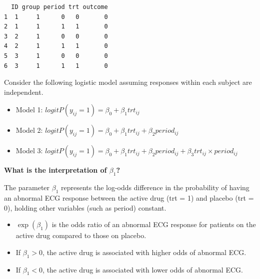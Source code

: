 \documentclass[
  letterpaper,
  DIV=11,
  numbers=noendperiod]{scrreprt}
\providecommand{\tightlist}{%
  \setlength{\itemsep}{0pt}\setlength{\parskip}{0pt}}\usepackage{longtable,booktabs,array}
\begin{document}
\begin{verbatim}
  ID group period trt outcome
1  1     1      0   0       0
2  1     1      1   1       0
3  2     1      0   0       0
4  2     1      1   1       0
5  3     1      0   0       0
6  3     1      1   1       0
\end{verbatim}

Consider the following logistic model assuming responses within each
subject are independent.

\begin{itemize}
\item
  Model 1: \(logit P(y_{ij} =1) = \beta_0 + \beta_1 trt_{ij}\)
\item
  Model 2:
  \(logit P(y_{ij} = 1) = \beta_0 + \beta_1 trt_{ij} + \beta_2 period_{ij}\)
\item
  Model 3:
  \(logit P(y_{ij} = 1) = \beta_0 + \beta_1 trt_{ij} + \beta_2 period_{ij} + \beta_3 trt_{ij} \times period_{ij}\)
\end{itemize}

\begin{tcolorbox}[enhanced jigsaw, rightrule=.15mm, breakable, left=2mm, colframe=quarto-callout-tip-color-frame, opacityback=0, leftrule=.75mm, toprule=.15mm, colback=white, arc=.35mm, bottomrule=.15mm]

\textbf{What is the interpretation of \(\beta_1\)?}\vspace{2mm}

The parameter \(\beta_1\) represents the log-odds difference in the
probability of having an abnormal ECG response between the active drug
(trt = 1) and placebo (trt = 0), holding other variables (such as
period) constant.

\begin{itemize}
\tightlist
\item
  \(\exp(\beta_1)\) is the odds ratio of an abnormal ECG response for
  patients on the active drug compared to those on placebo.
\item
  If \(\beta_1 > 0\), the active drug is associated with higher odds of
  abnormal ECG.
\item
  If \(\beta_1 < 0\), the active drug is associated with lower odds of
  abnormal ECG.
\end{itemize}

\end{tcolorbox}
\end{document}
